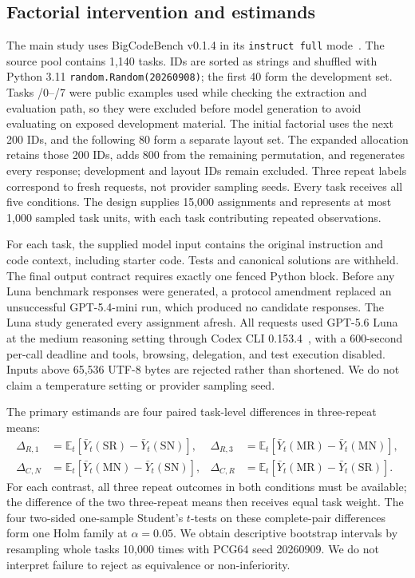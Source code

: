 \subsection{Factorial intervention and estimands}
The main study uses BigCodeBench v0.1.4 in its \texttt{instruct full} mode~\citep{zhuo2024bigcodebench}. The source pool contains 1,140 tasks. IDs are sorted as strings and shuffled with Python 3.11 \texttt{random.Random(20260908)}; the first 40 form the development set. Tasks /0--/7 were public examples used while checking the extraction and evaluation path, so they were excluded before model generation to avoid evaluating on exposed development material. The initial factorial uses the next 200 IDs, and the following 80 form a separate layout set. The expanded allocation retains those 200 IDs, adds 800 from the remaining permutation, and regenerates every response; development and layout IDs remain excluded. Three repeat labels correspond to fresh requests, not provider sampling seeds. Every task receives all five conditions. The design supplies 15,000 assignments and represents at most 1,000 sampled task units, with each task contributing repeated observations.

For each task, the supplied model input contains the original instruction and code context, including starter code. Tests and canonical solutions are withheld. The final output contract requires exactly one fenced Python block. Before any Luna benchmark responses were generated, a protocol amendment replaced an unsuccessful GPT-5.4-mini run, which produced no candidate responses. The Luna study generated every assignment afresh. All requests used GPT-5.6 Luna at the medium reasoning setting through Codex CLI 0.153.4~\citep{openai56luna2026,codexexec2026}, with a 600-second per-call deadline and tools, browsing, delegation, and test execution disabled. Inputs above 65,536 UTF-8 bytes are rejected rather than shortened. We do not claim a temperature setting or provider sampling seed.

The primary estimands are four paired task-level differences in three-repeat means:
\begin{align}
\Delta_{R,1}&=\mathbb{E}_t[\bar Y_t(\mathrm{SR})-\bar Y_t(\mathrm{SN})], &
\Delta_{R,3}&=\mathbb{E}_t[\bar Y_t(\mathrm{MR})-\bar Y_t(\mathrm{MN})],\\
\Delta_{C,N}&=\mathbb{E}_t[\bar Y_t(\mathrm{MN})-\bar Y_t(\mathrm{SN})], &
\Delta_{C,R}&=\mathbb{E}_t[\bar Y_t(\mathrm{MR})-\bar Y_t(\mathrm{SR})].
\end{align}
For each contrast, all three repeat outcomes in both conditions must be available; the difference of the two three-repeat means then receives equal task weight. The four two-sided one-sample Student's $t$-tests on these complete-pair differences form one Holm family at $\alpha=0.05$. We obtain descriptive bootstrap intervals by resampling whole tasks 10,000 times with PCG64 seed 20260909. We do not interpret failure to reject as equivalence or non-inferiority.

